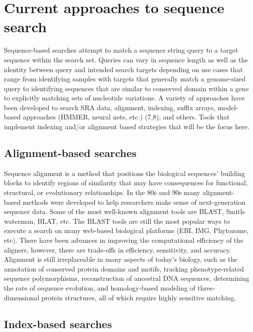 \section{Current approaches to sequence search}
\label{sec:SeqSearchApproches}

Sequence-based searches attempt to match a sequence string query to a target sequence within the search set. Queries can vary in sequence length as well as the identity between query and intended search targets depending on use cases that range from identifying samples with targets that generally match a genome-sized query to identifying sequences that are similar to conserved domain within a gene to explicitly matching sets of nucleotide variations. A variety of approaches have been developed to search SRA data, alignment, indexing, suffix arrays, model-based approaches (HMMER, neural nets, etc.) (7,8),  and others. Tools that implement indexing and/or alignment based strategies that will be the focus here. 

\subsection{Alignment-based searches}
\label{sec:AlignmentBased}

Sequence alignment is a method that positions the biological sequences’ building blocks to identify regions of similarity that may have consequences for functional, structural, or evolutionary relationships. In the 80s and 90s many alignment-based methods were developed to help researchers make sense of next-generation sequence data. Some of the most well-known alignment tools are BLAST, Smith-waterman, BLAT, etc. The BLAST tools are still the most popular ways to execute a search on many web-based biological platforms (EBI, IMG, Phytozome, etc). There have been advances in improving the computational efficiency of the aligners, however, there are trade-offs in efficiency, sensitivity, and accuracy. Alignment is still irreplaceable in many aspects of today's biology, such as the annotation of conserved protein domains and motifs, tracking phenotype-related sequence polymorphisms, reconstruction of ancestral DNA sequences, determining the rate of sequence evolution, and homology-based modeling of three-dimensional protein structures, all of which require highly sensitive matching.

\subsection{Index-based searches}
\label{sec:IndexBased}


